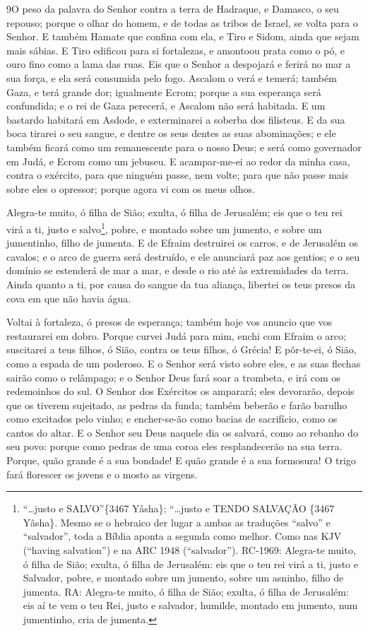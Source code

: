 \lettrine{9} O peso da palavra do Senhor contra a terra de
Hadraque, e Damasco, o seu repouso; porque o olhar do homem, e de
todas as tribos de Israel, se volta para o Senhor. E também
Hamate que confina com ela, e Tiro e Sidom, ainda que sejam mais
sábias. E Tiro edificou para si fortalezas, e amontoou prata
como o pó, e ouro fino como a lama das ruas. Eis que o Senhor a
despojará e ferirá no mar a sua força, e ela será consumida pelo
fogo. Ascalom o verá e temerá; também Gaza, e terá grande dor;
igualmente Ecrom; porque a sua esperança será confundida; e o rei de
Gaza perecerá, e Ascalom não será habitada. E um bastardo
habitará em Asdode, e exterminarei a soberba dos filisteus. E da
sua boca tirarei o seu sangue, e dentre os seus dentes as suas
abominações; e ele também ficará como um remanescente para o nosso
Deus; e será como governador em Judá, e Ecrom como um jebuseu. E
acampar-me-ei ao redor da minha casa, contra o exército, para que
ninguém passe, nem volte; para que não passe mais sobre eles o
opressor; porque agora vi com os meus olhos.

Alegra-te muito, ó filha de Sião; exulta, ó filha de Jerusalém;
eis que o teu rei virá a ti, justo e salvo\footnote{``\ldots{}justo
e SALVO''\{3467 Yâsha\}; ``\ldots{}justo e TENDO SALVAÇÃO \{3467
Yâsha\}. Mesmo se o hebraico der lugar a ambas as traduções
``salvo'' e ``salvador'', toda a Bíblia aponta a segunda como
melhor. Como nas KJV (``having salvation'') e na ARC 1948
(``salvador''). RC-1969: Alegra-te muito, ó filha de Sião; exulta, ó
filha de Jerusalém: eis que o teu rei virá a ti, justo e Salvador,
pobre, e montado sobre um jumento, sobre um asninho, filho de
jumenta. RA: Alegra-te muito, ó filha de Sião; exulta, ó filha de
Jerusalém: eis aí te vem o teu Rei, justo e salvador, humilde,
montado em jumento, num jumentinho, cria de jumenta.}, pobre, e
montado sobre um jumento, e sobre um jumentinho, filho de jumenta.
E de Efraim destruirei os carros, e de Jerusalém os cavalos;
e o arco de guerra será destruído, e ele anunciará paz aos gentios;
e o seu domínio se estenderá de mar a mar, e desde o rio até às
extremidades da terra. Ainda quanto a ti, por causa do sangue
da tua aliança, libertei os teus presos da cova em que não havia
água.

Voltai à fortaleza, ó presos de esperança; também hoje vos
anuncio que vos restaurarei em dobro. Porque curvei Judá para
mim, enchi com Efraim o arco; suscitarei a teus filhos, ó Sião,
contra os teus filhos, ó Grécia! E pôr-te-ei, ó Sião, como a espada
de um poderoso. E o Senhor será visto sobre eles, e as suas
flechas sairão como o relâmpago; e o Senhor Deus fará soar a
trombeta, e irá com os redemoinhos do sul. O Senhor dos
Exércitos os amparará; eles devorarão, depois que os tiverem
sujeitado, as pedras da funda; também beberão e farão barulho como
excitados pelo vinho; e encher-se-ão como bacias de sacrifício, como
os cantos do altar. E o Senhor seu Deus naquele dia os
salvará, como ao rebanho do seu povo: porque como pedras de uma
coroa eles resplandecerão na sua terra. Porque, quão grande é
a sua bondade! E quão grande é a sua formosura! O trigo fará
florescer os jovens e o mosto as virgens.

